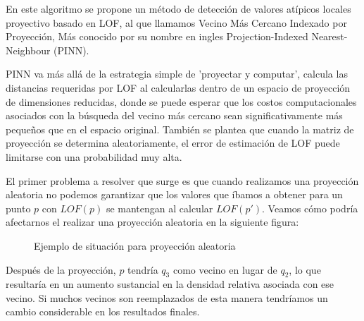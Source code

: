 En este algoritmo se propone un método de detección de valores 
atípicos locales proyectivo basado en LOF, al que llamamos Vecino 
Más Cercano Indexado por Proyección, Más conocido por su nombre en
ingles Projection-Indexed Nearest-Neighbour (PINN).

PINN va más allá de la estrategia simple de 'proyectar y computar',
calcula las distancias requeridas por LOF al calcularlas dentro de 
un espacio de proyección de dimensiones reducidas, donde se puede 
esperar que los costos computacionales asociados con la búsqueda 
del vecino más cercano sean significativamente más pequeños que en 
el espacio original. También se plantea que cuando la matriz de 
proyección se determina aleatoriamente, el error de estimación de 
LOF puede limitarse con una probabilidad muy alta.

El primer problema a resolver que surge es que cuando realizamos una
proyección aleatoria no podemos garantizar que los valores que íbamos
a obtener para un punto $p$ con $LOF(p)$ se mantengan al calcular
$LOF(p')$. Veamos cómo podría afectarnos el realizar una proyección
aleatoria en la siguiente figura:


\begin{figure}[h]
    \caption{\label{fig:aleatoria} Ejemplo de situación para proyección aleatoria}
\end{figure}

Después de la proyección, $p$ tendría $q_3$ como vecino en lugar de $q_2$, 
lo que resultaría en un aumento sustancial en la densidad relativa 
asociada con ese vecino. Si muchos vecinos son reemplazados de esta 
manera tendríamos un cambio considerable en los resultados finales.

